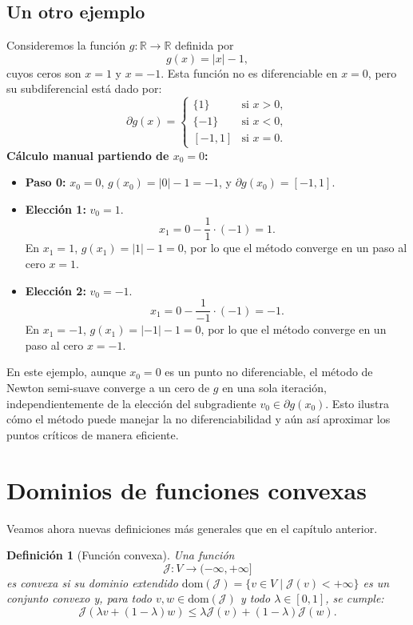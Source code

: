 \documentclass[12pt]{book}
\newtheorem{definition}{Definición}
\theoremstyle{definition}
\theoremstyle{plain}
\theoremstyle{remark}
\begin{document}
\subsection{Un otro ejemplo}

Consideremos la función \( g: \mathbb{R} \to \mathbb{R} \) definida por
\[
g(x) = |x| - 1,
\]
cuyos ceros son \( x = 1 \) y \( x = -1 \). Esta función no es diferenciable en \( x = 0 \), pero su subdiferencial está dado por:
\[
\partial g(x) =
\begin{cases}
\{1\} & \text{si } x > 0, \\
\{-1\} & \text{si } x < 0, \\
[-1, 1] & \text{si } x = 0.
\end{cases}
\]
\textbf{Cálculo manual partiendo de \( x_0 = 0 \):}
\begin{itemize}
    \item \textbf{Paso 0:} \( x_0 = 0 \), \( g(x_0) = |0| - 1 = -1 \), y \( \partial g(x_0) = [-1, 1] \).

    \item \textbf{Elección 1:} \( v_0 = 1 \).
    \[
    x_1 = 0 - \frac{1}{1} \cdot (-1) = 1.
    \]
    En \( x_1 = 1 \), \( g(x_1) = |1| - 1 = 0 \), por lo que el método converge en un paso al cero \( x = 1 \).

    \item \textbf{Elección 2:} \( v_0 = -1 \).
    \[
    x_1 = 0 - \frac{1}{-1} \cdot (-1) = -1.
    \]
    En \( x_1 = -1 \), \( g(x_1) = |-1| - 1 = 0 \), por lo que el método converge en un paso al cero \( x = -1 \).
\end{itemize}

En este ejemplo, aunque \( x_0 = 0 \) es un punto no diferenciable, el método de Newton semi-suave converge a un cero de \( g \) en una sola iteración, independientemente de la elección del subgradiente \( v_0 \in \partial g(x_0) \). Esto ilustra cómo el método puede manejar la no diferenciabilidad y aún así aproximar los puntos críticos de manera eficiente.

\section{Dominios de funciones convexas}

Veamos ahora nuevas definiciones m\'as generales que en el cap\'itulo anterior.

\begin{definition}[Función convexa]
Una función \[\mathcal{J}: V \to (-\infty, +\infty] \] es \emph{convexa} si su \emph{dominio extendido} \( \text{dom}(\mathcal{J}) = \{v \in V \mid \mathcal{J}(v) < +\infty\} \) es un conjunto convexo y, para todo \( v, w \in \text{dom}(\mathcal{J}) \) y todo \( \lambda \in [0,1] \), se cumple:
\[
\mathcal{J}(\lambda v + (1-\lambda) w) \leq \lambda \mathcal{J}(v) + (1-\lambda) \mathcal{J}(w).
\]
\end{definition}
\end{document}
